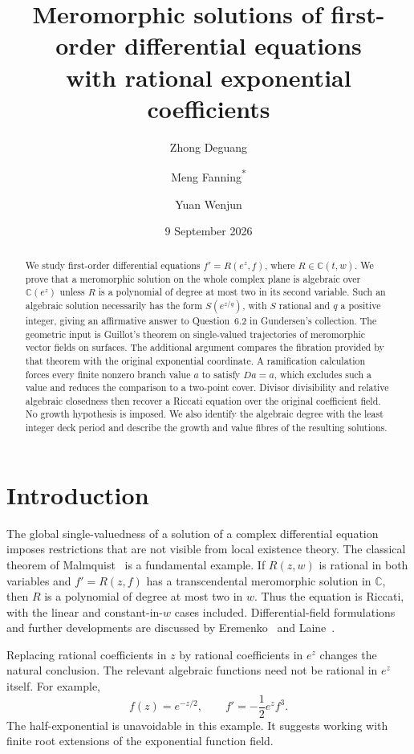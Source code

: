 \documentclass[11pt,reqno]{amsart}
\title[Meromorphic solutions with exponential coefficients]
{Meromorphic solutions of first-order differential equations\\
with rational exponential coefficients}
\author{Zhong Deguang}
\author{Meng Fanning\textsuperscript{*}}
\author{Yuan Wenjun}
\date{9 September 2026}
\numberwithin{equation}{section}
\theoremstyle{definition}
\theoremstyle{remark}
\newcommand{\C}{\mathbb C}
\begin{document}
\begin{abstract}
We study first-order differential equations $f'=R(e^z,f)$, where
$R\in\C(t,w)$. We prove that a meromorphic solution on the whole complex
plane is algebraic over $\C(e^z)$ unless $R$ is a polynomial of degree at most
two in its second variable. Such an algebraic solution necessarily has the
form $S(e^{z/q})$, with $S$ rational and $q$ a positive integer, giving an
affirmative answer to Question~6.2 in Gundersen's collection. The geometric
input is Guillot's theorem on single-valued trajectories of meromorphic
vector fields on surfaces. The additional argument compares the fibration
provided by that theorem with the original exponential coordinate. A
ramification calculation forces every finite nonzero branch value $a$ to
satisfy $Da=a$, which excludes such a value and reduces the comparison to
a two-point cover. Divisor divisibility and relative algebraic closedness
then recover a Riccati equation over the original coefficient field. No
growth hypothesis is imposed. We also identify the algebraic degree with
the least integer deck period and describe the growth and value fibres of
the resulting solutions.
\end{abstract}

\maketitle

\section{Introduction}
\label{sec:introduction}

The global single-valuedness of a solution of a complex differential
equation imposes restrictions that are not visible from local existence
theory. The classical theorem of Malmquist~\cite{Malmquist1913} is a
fundamental example. If $R(z,w)$ is rational in both variables and
$f'=R(z,f)$ has a transcendental meromorphic solution in $\C$, then $R$ is
a polynomial of degree at most two in $w$. Thus the equation is Riccati,
with the linear and constant-in-$w$ cases included. Differential-field
formulations and further developments are discussed by
Eremenko~\cite{Eremenko1982} and Laine~\cite{Laine1993}.

Replacing rational coefficients in $z$ by rational coefficients in $e^z$
changes the natural conclusion. The relevant algebraic functions need not
be rational in $e^z$ itself. For example,
\begin{equation}
 f(z)=e^{-z/2},\qquad f'=-\frac12 e^z f^3.
 \label{eq:historical-example}
\end{equation}
The half-exponential is unavoidable in this example. It suggests working
with finite root extensions of the exponential function field.
\end{document}
